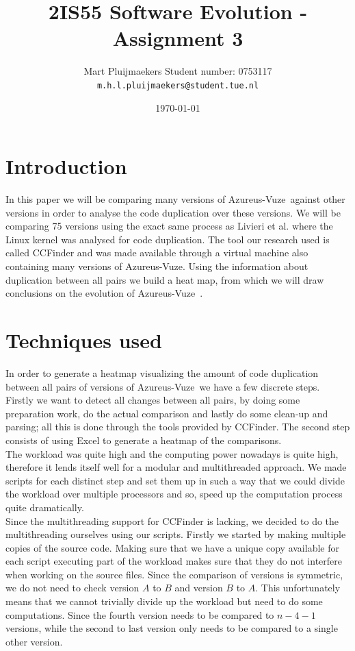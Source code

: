 \documentclass[a4paper,twoside,11pt]{article}
\title{\sffamily\bfseries 2IS55 Software Evolution - Assignment 3}
\author{Mart Pluijmaekers \qquad Student number: 0753117 \\{\tt m.h.l.pluijmaekers@student.tue.nl}}
\date{\today}
\newcommand{\av}{{\sc Azureus-Vuze}~}
\begin{document}
\maketitle
\tableofcontents
\newpage


\section{Introduction}
\label{sec:introduction}
In this paper we will be comparing many versions of \av against other versions in order to analyse the code duplication over these versions. We will be comparing 75 versions using the exact same process as Livieri et al.\cite{pap:liveiri} where the Linux kernel was analysed for code duplication. The tool our research used is called {\sc CCFinder}\cite{url:ccfinder} and was made available through a virtual machine also containing many versions of Azureus-Vuze. Using the information about duplication between all pairs we build a heat map, from which we will draw conclusions on the evolution of \av.


\section{Techniques used}
\label{sec:techniques}
In order to generate a heatmap visualizing the amount of code duplication between all pairs of versions of \av we have a few discrete steps. Firstly we want to detect all changes between all pairs, by doing some preparation work, do the actual comparison and lastly do some clean-up and parsing; all this is done through the tools provided by CCFinder. The second step consists of using Excel to generate a heatmap of the comparisons. \\

The workload was quite high and the computing power nowadays is quite high, therefore it lends itself well for a modular and multithreaded approach. We made scripts for each distinct step and set them up in such a way that we could divide the workload over multiple processors and so, speed up the computation process quite dramatically. \\

Since the multithreading support for CCFinder is lacking, we decided to do the multithreading ourselves using our scripts. Firstly we started by making multiple copies of the source code. Making sure that we have a unique copy available for each script executing part of the workload makes sure that they do not interfere when working on the source files. Since the comparison of versions is symmetric, we do not need to check version $A$ to $B$ and version $B$ to $A$. This unfortunately means that we cannot trivially divide up the workload but need to do some computations. Since the fourth version needs to be compared to $n-4-1$ versions, while the second to last version only needs to be compared to a single other version. \\
\end{document}

